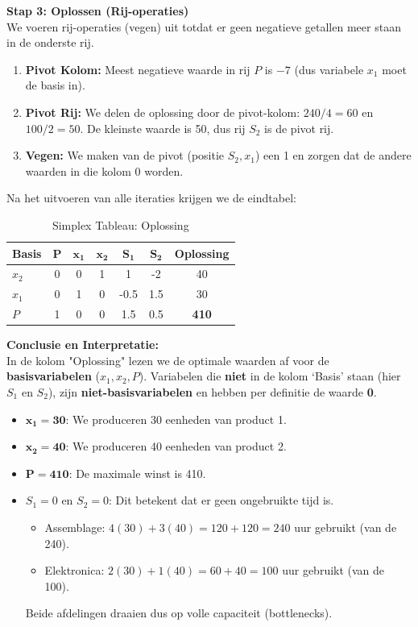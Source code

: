 \documentclass[a4paper,11pt]{article}
\begin{document}
\textbf{Stap 3: Oplossen (Rij-operaties)} \\
We voeren rij-operaties (vegen) uit totdat er geen negatieve getallen meer staan in de onderste rij.
\begin{enumerate}
    \item \textbf{Pivot Kolom:} Meest negatieve waarde in rij $P$ is $-7$ (dus variabele $x_1$ moet de basis in).
    \item \textbf{Pivot Rij:} We delen de oplossing door de pivot-kolom: $240/4 = 60$ en $100/2 = 50$. De kleinste waarde is 50, dus rij $S_2$ is de pivot rij.
    \item \textbf{Vegen:} We maken van de pivot (positie $S_2, x_1$) een 1 en zorgen dat de andere waarden in die kolom 0 worden.
\end{enumerate}
Na het uitvoeren van alle iteraties krijgen we de eindtabel:

\begin{table}[H]
    \centering
    \caption{Simplex Tableau: Oplossing}
    \begin{tabular}{lcccccc}
        \toprule
        \textbf{Basis} & $\mathbf{P}$ & $\mathbf{x_1}$ & $\mathbf{x_2}$ & $\mathbf{S_1}$ & $\mathbf{S_2}$ & \textbf{Oplossing} \\
        \midrule
        $x_2$ & 0 & 0 & 1 & 1 & -2 & 40 \\
        $x_1$ & 0 & 1 & 0 & -0.5 & 1.5 & 30 \\
        \midrule
        $P$ & 1 & 0 & 0 & 1.5 & 0.5 & \textbf{410} \\
        \bottomrule
    \end{tabular}
\end{table}

\textbf{Conclusie en Interpretatie:} \\
In de kolom "Oplossing" lezen we de optimale waarden af voor de \textbf{basisvariabelen} ($x_1, x_2, P$). 
Variabelen die \textbf{niet} in de kolom `Basis' staan (hier $S_1$ en $S_2$), zijn \textbf{niet-basisvariabelen}
 en hebben per definitie de waarde \textbf{0}.

\begin{itemize}
    \item $\mathbf{x_1 = 30}$: We produceren 30 eenheden van product 1.
    \item $\mathbf{x_2 = 40}$: We produceren 40 eenheden van product 2.
    \item $\mathbf{P = 410}$: De maximale winst is 410.
    \item $S_1 = 0$ en $S_2 = 0$: Dit betekent dat er geen ongebruikte tijd is.
    \begin{itemize}
        \item Assemblage: $4(30) + 3(40) = 120 + 120 = 240$ uur gebruikt (van de 240).
        \item Elektronica: $2(30) + 1(40) = 60 + 40 = 100$ uur gebruikt (van de 100).
    \end{itemize}
    Beide afdelingen draaien dus op volle capaciteit (bottlenecks).
\end{itemize}
\end{document}
